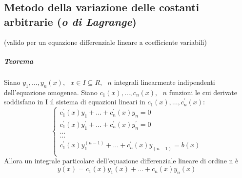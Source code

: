 \subsection{Metodo della variazione delle costanti arbitrarie (\textit{o di Lagrange})}
(valido per un equazione differenziale lineare a coefficiente variabili)
\subparagraph{Teorema}
Siano $y_1,\dots,y_n(x),\text{ } x\in I \subseteq R,\text{ }n$ integrali  linearmente indipendenti dell'equazione omogenea. Siano $c_1(x),\dots,c_n(x),\text{ }n$ funzioni le cui derivate soddisfano in I il sistema di equazioni lineari in $c_1(x),\dots,c_n^\prime(x)$:
\begin{equation*}
	\begin{cases}
		c_1^\prime(x)y_1+\dots+c_n^\prime(x)y_n=0\\
		c_1^\prime(x)y_1^\prime+\dots+c_n^\prime(x)y_n^\prime=0\\
		\dots\\
		\dots\\
		c_1^\prime(x)y_1^{(n-1)}+\dots+c_n^\prime(x)y_{(n-1)}=b(x)\\
	\end{cases}
\end{equation*}
Allora un integrale particolare dell'equazione differenziale lineare di ordine n è
\begin{equation*}
	\overline{y}(x)=c_1(x)y_1(x)+\dots+c_n(x)y_n(x)
\end{equation*}

